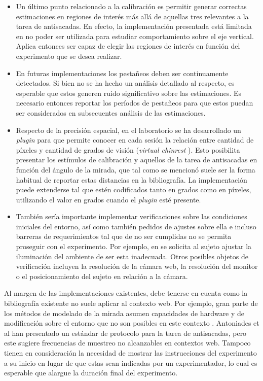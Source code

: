 \begin{itemize}
  \item Un último punto relacionado a la calibración es permitir generar
correctas estimaciones en regiones de interés más allá de aquellas tres
relevantes a la tarea de antisacadas.
  En efecto, la implementación presentada está limitada en no poder ser
utilizada para estudiar comportamiento sobre el eje vertical.
  Aplica entonces ser capaz de elegir las regiones de interés en función del
experimento que se desea realizar.

  \item En futuras implementaciones los pestañeos deben ser continuamente
detectados.
  Si bien no se ha hecho un análisis detallado al respecto, es esperable que
estos generen ruido significativo sobre las estimaciones.
  Es necesario entonces reportar los períodos de pestañeos para que estos
puedan ser considerados en subsecuentes análisis de las estimaciones.

  \item Respecto de la precisión espacial, en el laboratorio se ha desarrollado
un \textit{plugin} para \jspsych que permite conocer en cada sesión la relación
entre cantidad de píxeles y cantidad de grados de visión (\textit{virtual
chinrest} \cite{li_2020_virtual_chinrest}).
  Esto posibilita presentar los estímulos de calibración y aquellos de la tarea
de antisacadas en función del ángulo de la mirada, que tal como se mencionó
suele ser la forma habitual de reportar estas distancias en la bibliografía.
  La implementación puede extenderse tal que estén codificados tanto en grados
como en píxeles, utilizando el valor en grados cuando el \textit{plugin} esté
presente.

  \item También sería importante implementar verificaciones sobre las
condiciones iniciales del entorno, así como también pedidos de ajustes sobre
ella e incluso barreras de requerimientos tal que de no ser cumplidas no se
permita proseguir con el experimento.
  Por ejemplo, en \turkergaze se solicita al sujeto ajustar la iluminación del
ambiente de ser esta inadecuada.
  Otros posibles objetos de verificación incluyen la resolución de la cámara
web, la resolución del monitor o el posicionamiento del sujeto en relación a la
cámara.
\end{itemize}


Al margen de las implementaciones existentes, debe tenerse en cuenta como la
bibliografía existente no suele aplicar al contexto web.
Por ejemplo, gran parte de los métodos de modelado de la mirada asumen
capacidades de hardware y de modificación sobre el entorno que no son posibles
en este contexto \cite{hansen_2009_eye_of_the_beholder}.
Antoniades et al \cite{antoniades_2013_standarized_protocol} han presentado un
estándar de protocolo para la tarea de antisacadas, pero este sugiere
frecuencias de muestreo no alcanzables en contextos web.
Tampoco tienen en consideración la necesidad de mostrar las instrucciones del
experimento a su inicio en lugar de que estas sean indicadas por un
experimentador, lo cual es esperable que alargue la duración final del
experimento. 

